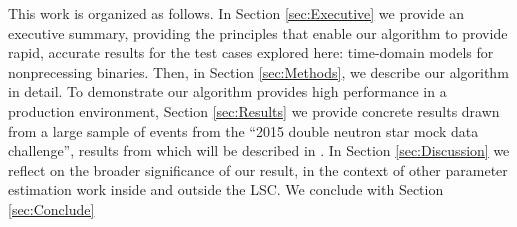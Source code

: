 This work is organized as follows.
In Section \ref{sec:Executive} we provide an executive summary, providing the principles that enable our algorithm to
provide rapid, accurate results for the test cases explored here:  time-domain models for nonprecessing binaries.  
%
Then, in Section \ref{sec:Methods}, we describe our algorithm in detail.  
%
To demonstrate  our algorithm provides high performance in a production environment,  Section \ref{sec:Results} we
provide concrete results drawn from a large sample of events from the ``2015 double neutron star mock data challenge'',
results from which will be described in .  
%
In Section \ref{sec:Discussion} we reflect on the broader significance of our result, in the context of other parameter
estimation work inside and outside the LSC.  
%
We conclude with Section \ref{sec:Conclude}
